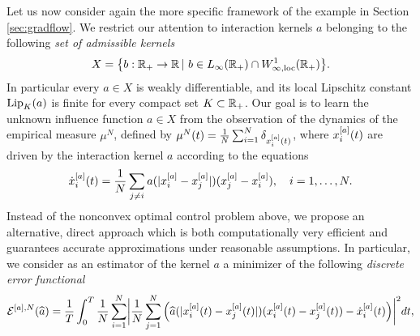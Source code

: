 Let us now consider again the more specific framework of the example in Section \ref{sec:gradflow}. We restrict our attention to interaction kernels $a$ belonging to the following \textit{set of admissible kernels}
\begin{align*}
	X=\bigl\{b:\mathbb{R}_+\rightarrow\mathbb{R}\,|\ b \in L_{\infty}(\mathbb{R}_+) \cap W^{1}_{\infty,\textup{loc}}(\mathbb{R}_+) \bigr \}.
\end{align*}
In particular every $a \in X$ is weakly differentiable, and its local Lipschitz constant $\textup{Lip}_{K}(a)$ is finite for every compact set $K \subset \mathbb{R}_+$.
Our goal is to learn the unknown influence function $a \in X$ from the observation of the dynamics of the empirical measure $\mu^N$, defined by $\mu^N(t)=\frac{1}{N} \sum_{i=1}^N \delta_{x^{[a]}_i(t)}$, where $x^{[a]}_i(t)$ are driven by the interaction kernel $a$ according to the equations 
\begin{equation}\label{fdgradientflow2}
\dot{x}^{[a]}_i(t) = \frac{1}{N} \sum_{j \neq i} a(| x^{[a]}_i -  x^{[a]}_j |) (x^{[a]}_j - x^{[a]}_i), \quad i=1,\dots,N.
\end{equation}
Instead of the nonconvex optimal control problem above, we propose an alternative, direct approach which is both computationally very efficient and guarantees accurate approximations under reasonable assumptions.
In particular, we consider as an estimator of the kernel $a$ a minimizer of the following \textit{discrete error functional}
\begin{align}\label{eq-def-error1}
	\begin{split}
	\mathcal E^{[a],N}(\widehat a) = \frac{1}{T}\int_0^T\frac{1}{N}\sum_{i=1}^N\biggl|\frac{1}{N}\sum_{j=1}^N
			\left(\widehat a(|x^{[a]}_i(t)-x^{[a]}_j(t)|)(x^{[a]}_i(t) - x^{[a]}_j(t))-\dot{x}^{[a]}_i(t)\right)\biggr|^2 dt,
	\end{split}
\end{align}
